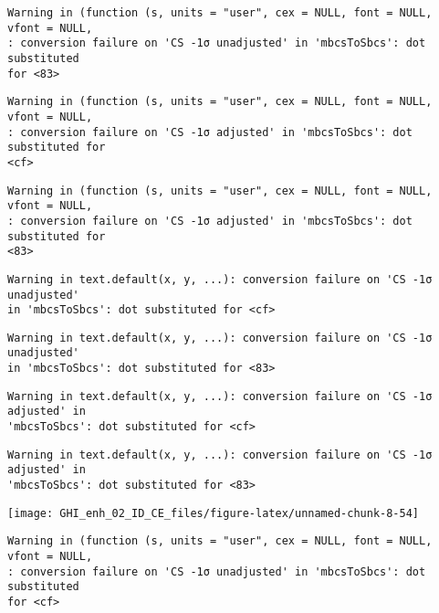 \documentclass[
  10pt,
  a4paper,oneside]{article}
\begin{document}
\begin{verbatim}
Warning in (function (s, units = "user", cex = NULL, font = NULL, vfont = NULL,
: conversion failure on 'CS -1σ unadjusted' in 'mbcsToSbcs': dot substituted
for <83>
\end{verbatim}

\begin{verbatim}
Warning in (function (s, units = "user", cex = NULL, font = NULL, vfont = NULL,
: conversion failure on 'CS -1σ adjusted' in 'mbcsToSbcs': dot substituted for
<cf>
\end{verbatim}

\begin{verbatim}
Warning in (function (s, units = "user", cex = NULL, font = NULL, vfont = NULL,
: conversion failure on 'CS -1σ adjusted' in 'mbcsToSbcs': dot substituted for
<83>
\end{verbatim}

\begin{verbatim}
Warning in text.default(x, y, ...): conversion failure on 'CS -1σ unadjusted'
in 'mbcsToSbcs': dot substituted for <cf>
\end{verbatim}

\begin{verbatim}
Warning in text.default(x, y, ...): conversion failure on 'CS -1σ unadjusted'
in 'mbcsToSbcs': dot substituted for <83>
\end{verbatim}

\begin{verbatim}
Warning in text.default(x, y, ...): conversion failure on 'CS -1σ adjusted' in
'mbcsToSbcs': dot substituted for <cf>
\end{verbatim}

\begin{verbatim}
Warning in text.default(x, y, ...): conversion failure on 'CS -1σ adjusted' in
'mbcsToSbcs': dot substituted for <83>
\end{verbatim}

\begin{center}\texttt{[image: GHI\_enh\_02\_ID\_CE\_files/figure-latex/unnamed-chunk-8-54]} \end{center}

\begin{verbatim}
Warning in (function (s, units = "user", cex = NULL, font = NULL, vfont = NULL,
: conversion failure on 'CS -1σ unadjusted' in 'mbcsToSbcs': dot substituted
for <cf>
\end{verbatim}
\end{document}
